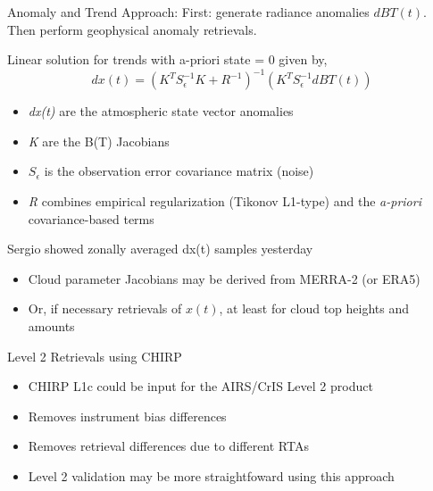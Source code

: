 \documentclass[10pt,t]{beamer}
\begin{document}
\begin{frame}[label={sec:org9e92127}]{Anomaly and Trend Approach:}
First: generate radiance anomalies \(dBT(t)\).\\
Then perform geophysical anomaly retrievals.\\

\vspace{0.1in}

Linear solution for trends with a-priori state = 0 given by,
\begin{displaymath}
dx(t) =  \left(K^T S_{\epsilon}^{-1} K + R^{-1}\right)^{-1} \left(K^T S_{\epsilon}^{-1} dBT(t)\right)
\end{displaymath}

\begin{itemize}
\item \emph{dx(t)} are the atmospheric state vector anomalies
\item \emph{K} are the B(T) Jacobians
\item \(S_{\epsilon}\) is the observation error covariance matrix (noise)
\item \emph{R} combines empirical regularization (Tikonov L1-type) and the \emph{a-priori} covariance-based terms
\end{itemize}

Sergio showed zonally averaged dx(t) samples yesterday\\

\small
\vspace{0.1in}
\begin{itemize}
\item Cloud parameter Jacobians may be derived from MERRA-2 (or ERA5)
\item Or, if necessary retrievals of \(x(t)\), at least for cloud top heights and amounts
\end{itemize}
\end{frame}

\begin{frame}[label={sec:org3f823d4}]{Level 2 Retrievals using CHIRP}
\begin{itemize}
\item CHIRP L1c could be input for the AIRS/CrIS Level 2 product
\item Removes instrument bias differences
\item Removes retrieval differences due to different RTAs
\item Level 2 validation may be more straightfoward using this approach
\end{itemize}
\end{frame}
\end{document}
